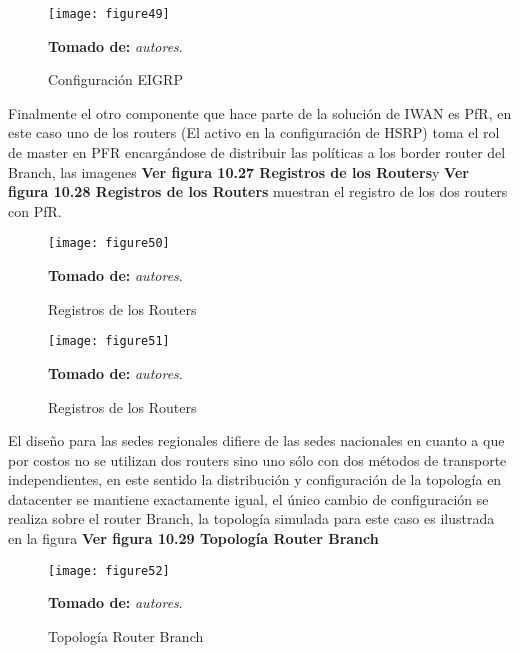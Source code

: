 \begin{figure}[htbp]
  \centering
    {\texttt{[image: figure49]}}%
  \caption{\footnotesize{Configuración EIGRP}}
  \footnotesize{\textbf{Tomado de:} \textit{autores}.}
  \label{fig:fig2subfig}
\end{figure}

Finalmente el otro componente que hace parte de la solución de IWAN es PfR, en este caso uno de los routers (El activo en la configuración de HSRP) toma el rol de master en PFR encargándose de distribuir las políticas a los border router del Branch, las imagenes \textbf{Ver figura 10.27 Registros de los Routers}y \textbf{Ver figura 10.28 Registros de los Routers} muestran el registro de los dos routers con PfR.

\begin{figure}[htbp]
  \centering
    {\texttt{[image: figure50]}}%
  \caption{\footnotesize{Registros de los Routers}}
  \footnotesize{\textbf{Tomado de:} \textit{autores}.}
  \label{fig:fig2subfig}
\end{figure}


\begin{figure}[htbp]
  \centering
    {\texttt{[image: figure51]}}%
  \caption{\footnotesize{Registros de los Routers}}
  \footnotesize{\textbf{Tomado de:} \textit{autores}.}
  \label{fig:fig2subfig}
\end{figure}

El diseño para las sedes regionales difiere de las sedes nacionales en cuanto a que por costos no se utilizan dos routers sino uno sólo con dos métodos de transporte independientes, en este sentido la distribución y configuración de la topología en datacenter se mantiene exactamente igual, el único cambio de configuración se realiza sobre el router Branch, la topología simulada para este caso es ilustrada en la figura \textbf{Ver figura 10.29 Topología Router Branch}

\begin{figure}[htbp]
  \centering
    {\texttt{[image: figure52]}}%
  \caption{\footnotesize{Topología Router Branch}}
  \footnotesize{\textbf{Tomado de:} \textit{autores}.}
  \label{fig:fig2subfig}
\end{figure}

